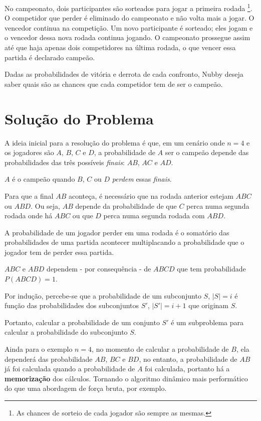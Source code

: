 \documentclass[10pt,a4paper]{article}
\begin{document}
	No campeonato, dois participantes são sorteados para jogar a primeira rodada \footnote{As chances de sorteio de cada jogador são sempre as mesmas.}. O competidor que perder é eliminado do campeonato e não volta mais a jogar. O vencedor continua na competição. Um novo participante é sorteado; eles jogam e o vencedor dessa nova rodada continua jogando. O campeonato prossegue assim até que haja apenas dois competidores na última rodada, o que vencer essa partida é declarado campeão.

	Dadas as probabilidades de vitória e derrota de cada confronto, Nubby deseja saber quais são as chances que cada competidor tem de ser o campeão.

	\section{Solução do Problema}

	A ideia inicial para a resolução do problema é que, em um cenário onde $n=4$ e os jogadores são $A$, $B$, $C$ e $D$, a probabilidade de $A$ ser o campeão depende das probabilidades das três possíveis \textit{finais}: $AB$, $AC$ e $AD$.

	$A$ é o campeão quando $B$, $C$ ou $D$ \emph{perdem} essas \textit{finais}.

	Para que a final $AB$ aconteça, é necessário que na rodada anterior estejam $ABC$ ou $ABD$. Ou seja, $AB$ depende da probabilidade de que $C$ perca numa segunda rodada onde há $ABC$ ou que $D$ perca numa segunda rodada com $ABD$.

	A probabilidade de um jogador perder em uma rodada é o somatório das probabilidades de uma partida acontecer multiplacando a probabilidade que o jogador tem de perder essa partida.

	$ABC$ e $ABD$ dependem - por consequência - de $ABCD$ que tem probabilidade $P(ABCD) = 1$.

	Por indução, percebe-se que a probabilidade de um subconjunto $S$, $|S|=i$ é função das probabilidades dos subconjuntos $S'$, $|S'|=i+1$ que originam $S$.

	Portanto, calcular a probabilidade de um conjunto $S'$ é um subproblema para calcular a probabilidade do subconjunto $S$.

	Ainda para o exemplo $n=4$, no momento de calcular a probabilidade de $B$, ela dependerá das probabilidade $AB$, $BC$ e $BD$, no entanto, a probabilidade de $AB$ já foi calculada quando a probabilidade de $A$ foi calculada, portanto há a \textbf{memorização} dos cálculos. Tornando o algoritmo dinâmico mais performático do que uma abordagem de força bruta, por exemplo.
\end{document}
